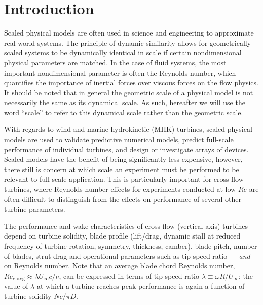 \documentclass[energies,article,accept,moreauthors,pdftex,12pt,a4paper]{mdpi}
\begin{document}
\listoftodos


\section{Introduction}

Scaled physical models are often used in science and engineering to approximate
real-world systems. The principle of dynamic similarity allows for geometrically
scaled systems to be dynamically identical in scale if certain nondimensional
physical parameters are matched. In the case of fluid systems, the most
important nondimensional parameter is often the Reynolds number, which
quantifies the importance of inertial forces over viscous forces on the flow
physics. It should be noted that in general the geometric scale of a physical
model is not necessarily the same as its dynamical scale. As such, hereafter we
will use the word ``scale'' to refer to this dynamical scale rather than the
geometric scale.


With regards to wind and marine hydrokinetic (MHK) turbines, scaled physical
models are used to validate predictive numerical models, predict full-scale
performance of individual turbines, and design or investigate arrays of devices.
Scaled models have the benefit of being significantly less expensive, however,
there still is concern at which
scale an experiment must be performed to be relevant to full-scale application.
This is particularly important for cross-flow turbines, where Reynolds number
effects for experiments conducted at low $Re$ are often difficult to
distinguish from the effects on performance of several other turbine
parameters.

The performance and wake characteristics of cross-flow (vertical
axis) turbines depend on turbine solidity, blade profile (lift/drag, dynamic
stall at reduced frequency of turbine rotation, symmetry, thickness, camber),
blade pitch, number of blades, strut drag and operational parameters such as
tip speed ratio --- {\em and} on Reynolds number.
Note that an average blade chord Reynolds number, $Re_{c,\mathrm{avg}} \approx
\lambda U_\infty c/ \nu$, can be expressed in terms of tip speed ratio $\lambda
\equiv \omega R/ U_\infty$; the value of $\lambda$ at which a turbine reaches
peak performance is again a function of turbine solidity $Nc/\pi D$.
\end{document}
